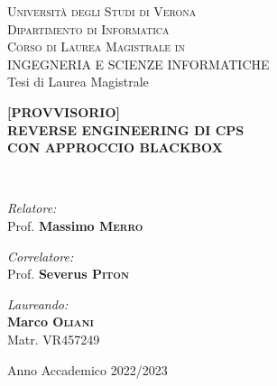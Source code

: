 \documentclass[a4paper,12pt,openright,twoside,titlepage]{book}
\begin{document}
\begin{titlepage}
	\begin{center}
		\thispagestyle{empty}
		
		
		
		\textsc{\LARGE Università degli Studi di Verona}\\
		\textsc{Dipartimento di Informatica}\\[1.0cm]
		\textsc{\large Corso di Laurea Magistrale in \\ 
			INGEGNERIA E SCIENZE INFORMATICHE}\\[1.5cm]
		
		\large Tesi di Laurea Magistrale \\[1.0cm]
		
		\hrulefill
		
		{ \Large\bfseries [PROVVISORIO] \\
			REVERSE ENGINEERING DI CPS \\ 
			CON APPROCCIO BLACKBOX \\ }
		
		\hrulefill \\[2.0cm]
		
		\begin{minipage}[t]{0.4\textwidth}
			\begin{flushleft} \large
				\emph{Relatore:}\\
				Prof. \textbf{Massimo \textsc{Merro}}
			\end{flushleft}
			\begin{flushleft} \large
				\emph{Correlatore:}\\
				Prof. \textbf{Severus \textsc{Piton}}
			\end{flushleft}
		\end{minipage}
		\begin{minipage}[t]{0.4\textwidth}\raggedleft
			\begin{flushright} \large
				\emph{Laureando:} \\
				\textbf{Marco \textsc{Oliani}} \\
				Matr. VR457249
			\end{flushright}
		\end{minipage}
		
		\vfill
		
		{\large Anno Accademico 2022/2023}
		
	\end{center}
\end{titlepage}
\end{document}
